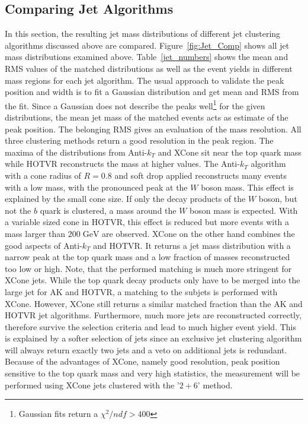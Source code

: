 \FloatBarrier %
\subsection{Comparing Jet Algorithms}
\label{sec:jet_comp}
	In this section, the resulting jet mass distributions of different jet clustering algorithms discussed above are compared. Figure~\ref{fig:Jet_Comp} shows all jet mass distributions examined above. Table~\ref{jet_numbers} shows the mean and RMS values of the matched distributions as well as the event yields in different mass regions for each jet algorithm. The usual approach to validate the peak position and width is to fit a Gaussian distribution and get mean and RMS from the fit. Since a Gaussian does not describe the peaks well\footnote{Gaussian fits return a $\chi^2/ndf > 400$} for the given distributions, the mean jet mass of the matched events acts as estimate of the peak position. The belonging RMS gives an evaluation of the mass resolution. All three clustering methods return a good resolution in the peak region. The maxima of the distributions from Anti-$k_T$ and XCone sit near the top quark mass while HOTVR reconstructs the mass at higher values. The Anti-$k_T$ algorithm with a cone radius of $R=0.8$ and soft drop applied reconstructs many events with a low mass, with the pronounced peak at the $W$ boson mass. This effect is explained by the small cone size. If only the decay products of the $W$ boson, but not the $b$ quark is clustered, a mass around the $W$ boson mass is expected. With a variable sized cone in HOTVR, this effect is reduced but more events with a mass larger than $200\;\text{GeV}$ are observed. XCone on the other hand combines the good aspects of Anti-$k_T$ and HOTVR. It returns a jet mass distribution with a narrow peak at the top quark mass and a low fraction of masses reconstructed too low or high. Note, that the performed matching is much more stringent for XCone jets. While the top quark decay products only have to be merged into the large jet for AK and HOTVR, a matching to the subjets is performed with XCone. However, XCone still returns a similar matched fraction than the AK and HOTVR jet algorithms.  Furthermore, much more jets are reconstructed correctly, therefore survive the selection criteria and lead to much higher event yield. This is explained by a softer selection of jets since an exclusive jet clustering algorithm will always return exactly two jets and a veto on additional jets is redundant. Because of the advantages of XCone, namely good resolution, peak position sensitive to the top quark mass and very high statistics, the measurement will be performed using XCone jets clustered with the '$2+6$' method.
	
